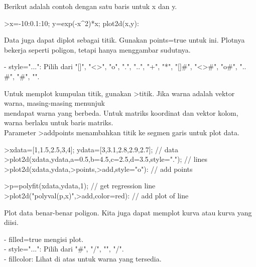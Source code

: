 \documentclass[a4paper,10pt]{article}
\begin{document}
\begin{eulernotebook}
\begin{eulercomment}
\begin{eulercomment}
\begin{eulercomment}
\begin{eulercomment}
\begin{eulercomment}
Berikut adalah contoh dengan satu baris untuk x dan y.

\end{eulercomment}
\begin{eulerprompt}
>x=-10:0.1:10; y=exp(-x^2)*x; plot2d(x,y):
\end{eulerprompt}
\begin{eulercomment}
Data juga dapat diplot sebagai titik. Gunakan points=true untuk ini.
Plotnya bekerja seperti poligon, tetapi hanya menggambar sudutnya.

- style="...": Pilih dari "[]", "\textless{}\textgreater{}", "o", ".", "..", "+", "*", "[]#",
"\textless{}\textgreater{}#", "o#", ".. #", "#", "\textbar{}".

Untuk memplot kumpulan titik, gunakan \textgreater{}titik. Jika warna adalah vektor
warna, masing-masing menunjuk\\
mendapat warna yang berbeda. Untuk matriks koordinat dan vektor kolom,
warna berlaku untuk baris matriks.\\
Parameter \textgreater{}addpoints menambahkan titik ke segmen garis untuk plot
data.
\end{eulercomment}
\begin{eulerprompt}
>xdata=[1,1.5,2.5,3,4]; ydata=[3,3.1,2.8,2.9,2.7]; // data
>plot2d(xdata,ydata,a=0.5,b=4.5,c=2.5,d=3.5,style="."); // lines
>plot2d(xdata,ydata,>points,>add,style="o"): // add points
\end{eulerprompt}
\begin{eulerprompt}
>p=polyfit(xdata,ydata,1); // get regression line
>plot2d("polyval(p,x)",>add,color=red): // add plot of line
\end{eulerprompt}
\begin{eulercomment}
Plot data benar-benar poligon. Kita juga dapat memplot kurva atau
kurva yang diisi.

- filled=true mengisi plot.\\
- style="...": Pilih dari "#", "/", "", "/".\\
- fillcolor: Lihat di atas untuk warna yang tersedia.


\end{eulercomment}
\end{eulercomment}
\end{eulercomment}
\end{eulercomment}
\end{eulercomment}
\end{eulernotebook}
\end{document}
